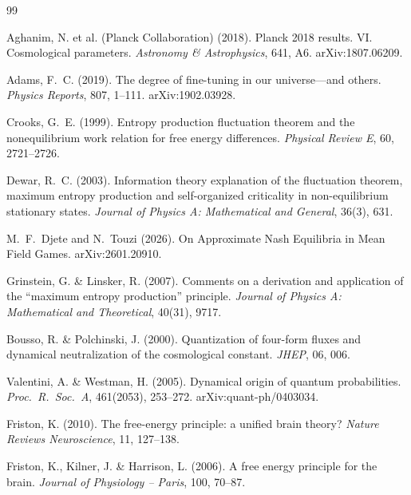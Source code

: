 \documentclass[12pt,a4paper]{article}
\theoremstyle{remark}
\begin{document}

\begin{thebibliography}{99}

Aghanim, N. et al. (Planck Collaboration) (2018).
\newblock Planck 2018 results. VI. Cosmological parameters.
\newblock \textit{Astronomy \& Astrophysics}, 641, A6.
\newblock arXiv:1807.06209.

Adams, F.~C. (2019).
\newblock The degree of fine-tuning in our universe---and others.
\newblock \textit{Physics Reports}, 807, 1--111.
\newblock arXiv:1902.03928.

Crooks, G.~E. (1999).
\newblock Entropy production fluctuation theorem and the nonequilibrium work relation for free energy differences.
\newblock \textit{Physical Review E}, 60, 2721--2726.

Dewar, R.~C. (2003).
\newblock Information theory explanation of the fluctuation theorem, maximum entropy production and self-organized criticality in non-equilibrium stationary states.
\newblock \textit{Journal of Physics A: Mathematical and General}, 36(3), 631.

M.~F.~Djete and N.~Touzi (2026).
\newblock On Approximate Nash Equilibria in Mean Field Games.
\newblock arXiv:2601.20910.

Grinstein, G. \& Linsker, R. (2007).
\newblock Comments on a derivation and application of the ``maximum entropy production'' principle.
\newblock \textit{Journal of Physics A: Mathematical and Theoretical}, 40(31), 9717.

Bousso, R. \& Polchinski, J. (2000).
\newblock Quantization of four-form fluxes and dynamical neutralization of the cosmological constant.
\newblock \textit{JHEP}, 06, 006.

Valentini, A. \& Westman, H. (2005).
\newblock Dynamical origin of quantum probabilities.
\newblock \textit{Proc.\ R.\ Soc.\ A}, 461(2053), 253--272. arXiv:quant-ph/0403034.

Friston, K. (2010).
\newblock The free-energy principle: a unified brain theory?
\newblock \textit{Nature Reviews Neuroscience}, 11, 127--138.

Friston, K., Kilner, J. \& Harrison, L. (2006).
\newblock A free energy principle for the brain.
\newblock \textit{Journal of Physiology -- Paris}, 100, 70--87.


\end{thebibliography}
\end{document}
